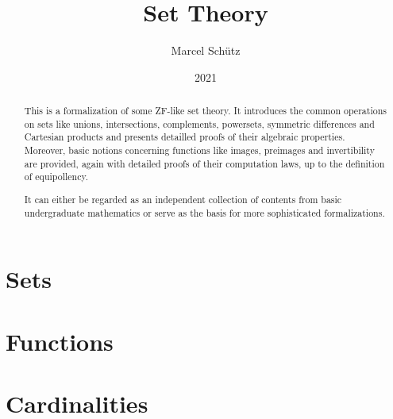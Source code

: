 \documentclass{article}
\title{Set Theory}
\author{Marcel Schütz}
\date{2021}
\begin{document}
  \maketitle

  \begin{abstract}
    This is a formalization of some ZF-like set theory.
    It introduces the common operations on sets like unions, intersections,
    complements, powersets, symmetric differences and Cartesian products and
    presents detailled proofs of their algebraic properties.
    Moreover, basic notions concerning functions like images, preimages and
    invertibility are provided, again with detailed proofs of their computation
    laws, up to the definition of equipollency.

    It can either be regarded as an independent collection of contents from
    basic undergraduate mathematics or serve as the basis for more
    sophisticated formalizations.
  \end{abstract}

  \tableofcontents

  \newpage
  \part{Sets}

  

  

  

  

  

  


  \newpage
  \part{Functions}

  

  

  

  

  

  


  \newpage
  \part{Cardinalities}

  
\end{document}
